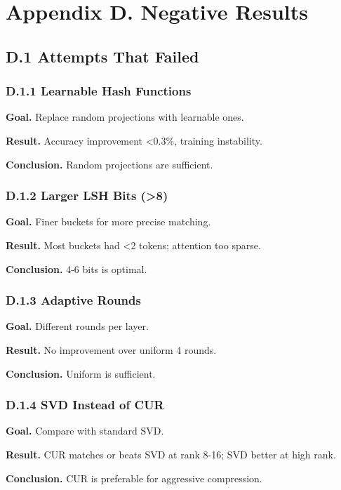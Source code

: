 
\section{Appendix D. Negative Results}

\subsection{D.1 Attempts That Failed}

\subsubsection{D.1.1 Learnable Hash Functions}

\textbf{Goal.} Replace random projections with learnable ones.

\textbf{Result.} Accuracy improvement <0.3\%, training instability.

\textbf{Conclusion.} Random projections are sufficient.

\subsubsection{D.1.2 Larger LSH Bits (>8)}

\textbf{Goal.} Finer buckets for more precise matching.

\textbf{Result.} Most buckets had <2 tokens; attention too sparse.

\textbf{Conclusion.} 4-6 bits is optimal.

\subsubsection{D.1.3 Adaptive Rounds}

\textbf{Goal.} Different rounds per layer.

\textbf{Result.} No improvement over uniform 4 rounds.

\textbf{Conclusion.} Uniform is sufficient.

\subsubsection{D.1.4 SVD Instead of CUR}

\textbf{Goal.} Compare with standard SVD.

\textbf{Result.} CUR matches or beats SVD at rank 8-16; SVD better at high rank.

\textbf{Conclusion.} CUR is preferable for aggressive compression.

